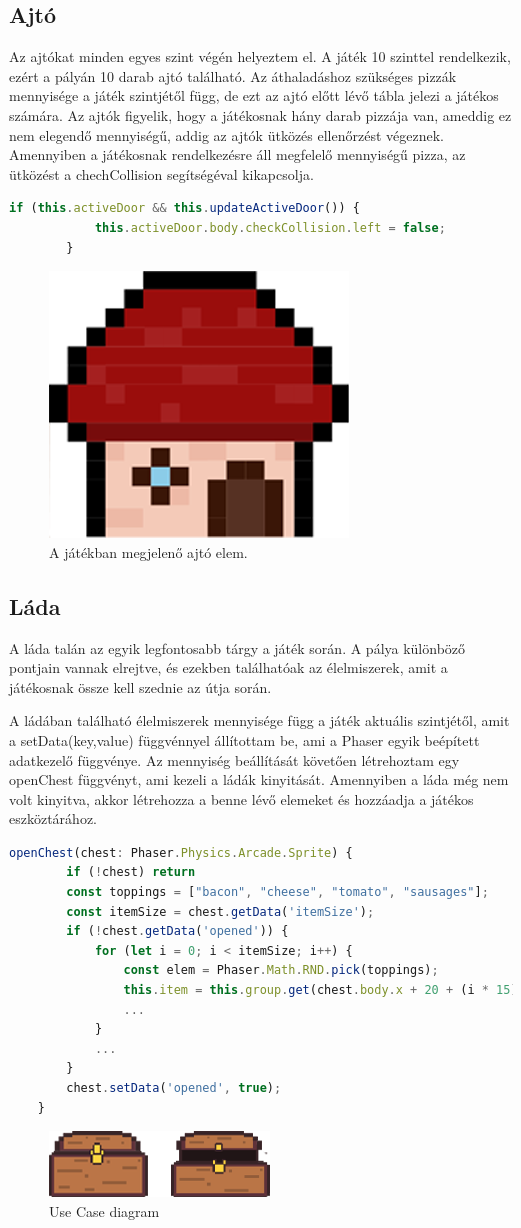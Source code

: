\documentclass[12pt, a4paper]{report}
\theoremstyle{definition}
\begin{document}
	\subsection{Ajtó}
	Az ajtókat minden egyes szint végén helyeztem el. A játék 10 szinttel rendelkezik, ezért a pályán 10 darab ajtó található. Az áthaladáshoz szükséges pizzák mennyisége a játék szintjétől függ, de ezt az ajtó előtt lévő tábla jelezi a játékos számára.
	Az ajtók figyelik, hogy a játékosnak hány darab pizzája van, ameddig ez nem elegendő mennyiségű, addig az ajtók ütközés ellenőrzést végeznek. Amennyiben a játékosnak rendelkezésre áll megfelelő mennyiségű pizza, az ütközést a chechCollision segítségéval kikapcsolja.
	\begin{lstlisting}[language=JavaScript]
		if (this.activeDoor && this.updateActiveDoor()) {
			this.activeDoor.body.checkCollision.left = false;
		}
	\end{lstlisting}
	\begin{figure}[!h]
		\centering
		\includegraphics[width=0.2\linewidth]{./images/door.png}
		\caption{A játékban megjelenő ajtó elem.}
		\label{fig:usecase}
	\end{figure}
	\subsection{Láda}
	A láda talán az egyik legfontosabb tárgy a játék során. A pálya különböző pontjain vannak elrejtve, és ezekben találhatóak az élelmiszerek, amit a játékosnak össze kell szednie az útja során.

	A ládában található élelmiszerek mennyisége függ a játék aktuális szintjétől, amit a setData(key,value) függvénnyel állítottam be, ami a Phaser egyik beépített adatkezelő függvénye. Az mennyiség beállítását követően létrehoztam egy openChest függvényt, ami kezeli a ládák kinyitását. Amennyiben a láda még nem volt kinyitva, akkor létrehozza a benne lévő elemeket és hozzáadja a játékos eszköztárához.
 
	\begin{lstlisting}[language=JavaScript]
	openChest(chest: Phaser.Physics.Arcade.Sprite) {
		if (!chest) return
		const toppings = ["bacon", "cheese", "tomato", "sausages"];
		const itemSize = chest.getData('itemSize');
		if (!chest.getData('opened')) {
			for (let i = 0; i < itemSize; i++) {
				const elem = Phaser.Math.RND.pick(toppings);
				this.item = this.group.get(chest.body.x + 20 + (i * 15), chest.body.y - 10, elem);
				...
			}
			...
		}
		chest.setData('opened', true);
	}
	\end{lstlisting}
	\begin{figure}[!h]
		\centering
		\includegraphics[width=0.3\linewidth]{./images/chest.png}
		\caption{Use Case diagram}
		\label{fig:usecase}
	\end{figure}
\end{document}
